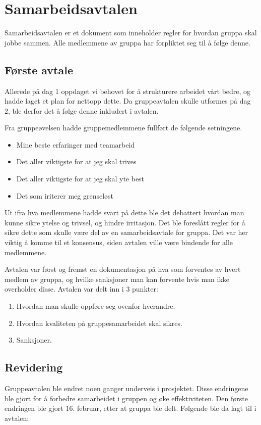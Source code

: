 \section{Samarbeidsavtalen}
Samarbeidsavtalen er et dokument som inneholder regler for hvordan gruppa skal jobbe sammen.
Alle medlemmene av gruppa har forpliktet seg til å følge denne.

\subsection{Første avtale}
Allerede på dag 1 oppdaget vi behovet for å strukturere arbeidet vårt bedre, og hadde laget et plan for nettopp dette.
Da gruppeavtalen skulle utformes på dag 2, ble derfor det å følge denne inkludert i avtalen.

Fra gruppeøvelsen hadde gruppemedlemmene fullført de følgende setningene.
\begin{itemize}
\item Mine beste erfaringer med teamarbeid
\item Det aller viktigste for at jeg skal trives
\item Det aller viktigste for at jeg skal yte best
\item Det som iriterer meg grenseløst
\end{itemize}

Ut ifra hva medlemmene hadde svart på dette ble det debattert hvordan man kunne sikre ytelse og trivsel, og hindre irritasjon.
Det ble foreslått regler for å sikre dette som skulle være del av en samarbeidsavtale for gruppa.
Det var her viktig å komme til et konsensus, siden avtalen ville være bindende for alle medlemmene.

Avtalen var først og fremst en dokumentasjon på hva som forventes av hvert
medlem av gruppa, og hvilke sanksjoner man kan forvente hvis man ikke
overholder disse. Avtalen var delt inn i 3 punkter: 
\begin{enumerate}
	\item Hvordan man skulle oppføre seg ovenfor hverandre.
	\item Hvordan kvaliteten på gruppesamarbeidet skal sikres.
	\item Sanksjoner.
\end{enumerate}

\subsection{Revidering}
Gruppeavtalen ble endret noen ganger underveis i prosjektet.
Disse endringene ble gjort for å forbedre samarbeidet i gruppen og øke effektiviteten.
Den første endringen ble gjort 16. februar, etter at gruppa ble delt.
Følgende ble da lagt til i avtalen:\newline

